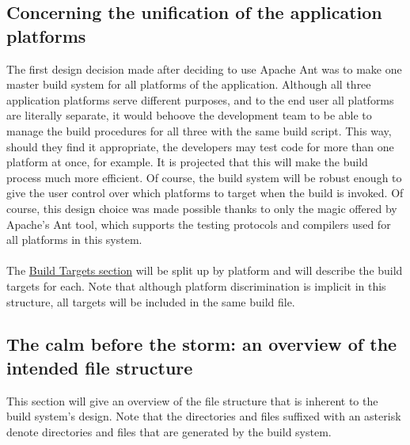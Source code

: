 \documentclass[12pt]{report}
\begin{document}
\subsection{Concerning the unification of the application platforms}
The first design decision made after deciding to use Apache Ant was to make one master build system
for all platforms of the application. Although all three application platforms serve different
purposes, and to the end user all platforms are literally separate, it would behoove the development
team to be able to manage the build procedures for all three with the same build script. This way,
should they find it appropriate, the developers may test code for more than one platform at once,
for example. It is projected that this will make the build process much more efficient. Of course,
the build system will be robust enough to give the user control over which platforms to target when
the build is invoked. Of course, this design choice was made possible thanks to only the magic
offered by Apache's Ant tool, which supports the testing protocols and compilers used for all
platforms in this system.\\\\
The \hyperref[s:build-targets]{Build Targets section} will be split up by platform and will describe
the build targets for each.
Note that although platform discrimination is implicit in this structure, all targets will be
included in the same build file.

\subsection{The calm before the storm: an overview of the intended file structure}
\label{s:build-dirtree}
This section will give an overview of the file structure that is inherent to the build system's
design. Note that the directories and files suffixed with an asterisk denote directories and files
that are generated by the build system.\\\\\
\end{document}
